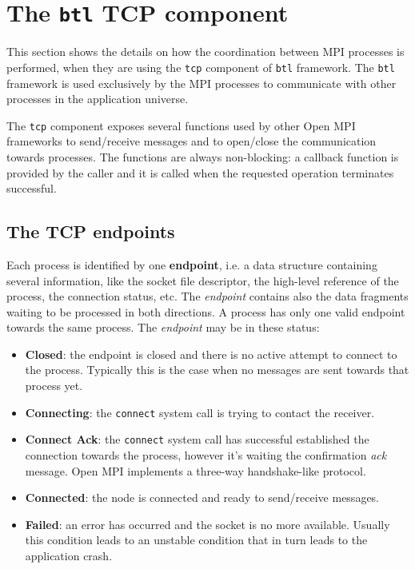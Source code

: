 \section{The \texttt{btl} TCP component}
\label{sec:btlcoord}
This section shows the details on how the coordination between MPI processes
is performed, when they are using the \texttt{tcp} component of \texttt{btl}
framework. The \texttt{btl} framework is used exclusively by the MPI processes
to communicate with other processes in the application universe.

The \texttt{tcp} component exposes several functions used by other Open MPI
frameworks to send/receive messages and to open/close the communication towards
processes. The functions are always non-blocking: a callback function is
provided by the caller and it is called when the requested operation terminates
successful.

\subsection{The TCP endpoints}
Each process is identified by one \textbf{endpoint}, i.e. a data structure
containing several information, like the socket file descriptor, the high-level
reference of the process, the connection status, etc. The \emph{endpoint}
contains also the data fragments waiting to be processed in both directions.
A process has only one valid endpoint towards the same process.
The \emph{endpoint} may be in these status:
\begin{itemize}
\item \textbf{Closed}: the endpoint is closed and there is no active attempt to
                       connect to the process. Typically this is the case when
                       no messages are sent towards that process yet.
\item \textbf{Connecting}: the \texttt{connect} system call is trying to contact
                           the receiver.
\item \textbf{Connect Ack}: the \texttt{connect} system call has successful
                            established the connection towards the process,
                            however it's waiting the confirmation \emph{ack}
                            message. Open MPI implements a three-way
                            handshake-like protocol.
\item \textbf{Connected}: the node is connected and ready to send/receive
                          messages.
\item \textbf{Failed}: an error has occurred and the socket is no more
                       available. Usually this condition leads to an unstable
                       condition that in turn leads to the application crash.
\end{itemize}

